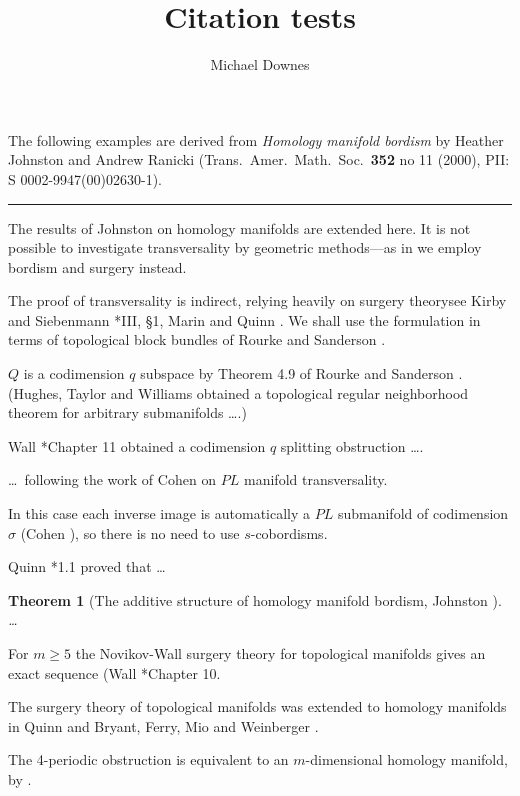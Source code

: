 \documentclass{amsart}
\newtheorem{thm}{Theorem}[section]
\begin{document}
\title{Citation tests}

\author{Michael Downes}

   The following examples are derived from
   \emph{Homology manifold bordism} by Heather Johnston and Andrew
   Ranicki (Trans.\ Amer.\ Math.\ Soc.\ \textbf{352} no 11 (2000), PII: S
   0002-9947(00)02630-1).

\bigskip \noindent \rule{\columnwidth}{0.5pt}\par

\setcounter{section}{3}

The results of Johnston \cite{Jo} on homology
manifolds are extended here. It is not
possible to investigate transversality by
geometric methods---as in \cite{Jo} we employ
bordism and surgery instead.

The proof of transversality is indirect,
relying heavily on surgery theory\mdash see
Kirby and Siebenmann \cite{KS}*{III, \S 1},
Marin \cite{M} and Quinn \cite{Q3}. We shall
use the formulation in terms of topological
block bundles of Rourke and Sanderson
\cite{RS}.

$Q$ is a codimension $q$ subspace by Theorem
4.9 of Rourke and Sanderson \cite{RS}.
(Hughes, Taylor and Williams \cite{HTW}
obtained a topological regular neighborhood
theorem for arbitrary submanifolds \dots.)

Wall \cite{Wa}*{Chapter 11} obtained a
codimension $q$ splitting obstruction \dots.

\dots\ following the work of Cohen \cite{Co}
on $PL$ manifold transversality.

In this case each inverse image is
automatically a $PL$ submanifold of
codimension $\sigma$ (Cohen \cite{Co}), so
there is no need to use $s$-cobordisms.

Quinn \cite{Q2}*{1.1} proved that \dots

\begin{thm}[The additive structure of
  homology manifold bordism, Johnston
  \cite{Jo}]
\dots
\end{thm}

For $m\geq 5$ the Novikov-Wall surgery theory
for topological manifolds gives an exact
sequence (Wall \cite{Wa}*{Chapter 10}.

The surgery theory of topological manifolds
was extended to homology manifolds in Quinn
\cites{Q1,Q2} and Bryant, Ferry, Mio
and Weinberger \cite{BFMW}.

The 4-periodic obstruction is equivalent to
an $m$-dimensional homology manifold, by
\cite{BFMW}.
\end{document}
